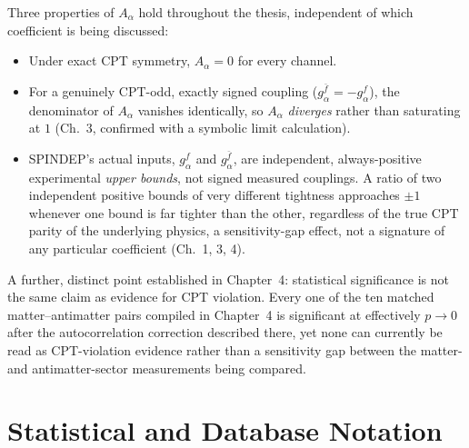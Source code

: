 \documentclass[main]{subfiles}
\begin{document}
Three properties of $A_\alpha$ hold throughout the thesis, independent of
which coefficient is being discussed:
\begin{itemize}
  \item Under exact CPT symmetry, $A_\alpha=0$ for every channel.
  \item For a genuinely CPT-odd, exactly signed coupling
    ($g_\alpha^{\bar f}=-g_\alpha^f$), the denominator of $A_\alpha$
    vanishes identically, so $A_\alpha$ \emph{diverges} rather than
    saturating at $1$ (Ch.~3, confirmed with a symbolic limit calculation).
  \item SPINDEP's actual inputs, $g_\alpha^f$ and $g_\alpha^{\bar f}$, are
    independent, always-positive experimental \emph{upper bounds}, not
    signed measured couplings. A ratio of two independent positive bounds
    of very different tightness approaches $\pm1$ whenever one bound is far
    tighter than the other, regardless of the true CPT parity of the
    underlying physics, a sensitivity-gap effect, not a signature of any
    particular coefficient (Ch.~1, 3, 4).
\end{itemize}
A further, distinct point established in Chapter~4: statistical
significance is not the same claim as evidence for CPT violation. Every one
of the ten matched matter--antimatter pairs compiled in Chapter~4 is
significant at effectively $p\to0$ after the autocorrelation correction
described there, yet none can currently be read as CPT-violation evidence
rather than a sensitivity gap between the matter- and antimatter-sector
measurements being compared.

\section{Statistical and Database Notation}
\end{document}
